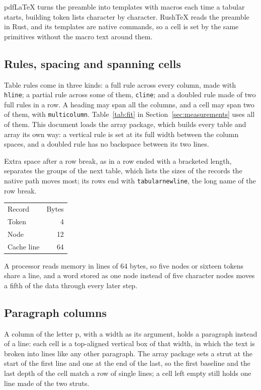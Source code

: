 \documentclass{article}
\numberwithin{equation}{section}
\theoremstyle{definition}
\theoremstyle{remark}
\begin{document}
pdfLaTeX turns the preamble into templates with macros each time a tabular starts,
building token lists character by character. RushTeX reads the preamble in Rust, and its
templates are native commands, so a cell is set by the same primitives without the
macro text around them.

\subsection{Rules, spacing and spanning cells}

Table rules come in three kinds: a full rule across every column, made with
\texttt{hline}; a partial rule across some of them, \texttt{cline}; and a doubled rule
made of two full rules in a row. A heading may span all the columns, and a cell may span
two of them, with \texttt{multicolumn}. Table~\ref{tab:fit} in
Section~\ref{sec:measurements} uses all of them. This document loads the array package,
which builds every table and array its own way: a vertical rule is set at its full width
between the column spaces, and a doubled rule has no backspace between its two lines.

Extra space after a row break, as in a row ended with a bracketed length, separates the
groups of the next table, which lists the sizes of the records the native path moves
most; its rows end with \texttt{tabularnewline}, the long name of the row break.

\begin{center}
\begin{tabular}{l r}
Record & Bytes \tabularnewline[2pt]
Token & 4 \tabularnewline
Node & 12 \\[2pt]
Cache line & 64 \\
\end{tabular}
\end{center}

A processor reads memory in lines of 64 bytes, so five nodes or sixteen tokens share a
line, and a word stored as one node instead of five character nodes moves a fifth of the
data through every later step.

\subsection{Paragraph columns}

A column of the letter p, with a width as its argument, holds a paragraph instead of a
line: each cell is a top-aligned vertical box of that width, in which the text is broken
into lines like any other paragraph. The array package sets a strut at the start of the
first line and one at the end of the last, so the first baseline and the last depth of the
cell match a row of single lines; a cell left empty still holds one line made of the two
struts.
\end{document}
